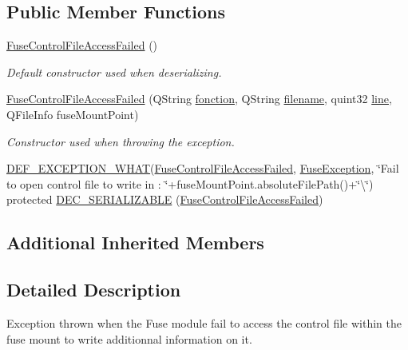 \subsection*{Public Member Functions}
\begin{DoxyCompactItemize}
\item 
\hyperlink{class_gost_crypt_1_1_fuse_driver_1_1_fuse_control_file_access_failed_aad1e46a257f485e7716c7c75765245b1}{Fuse\+Control\+File\+Access\+Failed} ()
\begin{DoxyCompactList}\small\item\em Default constructor used when deserializing. \end{DoxyCompactList}\item 
\hyperlink{class_gost_crypt_1_1_fuse_driver_1_1_fuse_control_file_access_failed_ae848ed52b1604cc801a9811f53493635}{Fuse\+Control\+File\+Access\+Failed} (Q\+String \hyperlink{class_gost_crypt_1_1_gost_crypt_exception_a29b8c93d5efbb1ff369107385725a939}{fonction}, Q\+String \hyperlink{class_gost_crypt_1_1_gost_crypt_exception_a749a12375f4ba9d502623b99d8252f38}{filename}, quint32 \hyperlink{class_gost_crypt_1_1_gost_crypt_exception_abf506d911f12a4e969eea500f90bd32c}{line}, Q\+File\+Info fuse\+Mount\+Point)
\begin{DoxyCompactList}\small\item\em Constructor used when throwing the exception. \end{DoxyCompactList}\item 
\hyperlink{_gost_crypt_exception_8h_a5bc1e1c6c9d6f46c84eeba49e33355f9}{D\+E\+F\+\_\+\+E\+X\+C\+E\+P\+T\+I\+O\+N\+\_\+\+W\+H\+AT}(\hyperlink{class_gost_crypt_1_1_fuse_driver_1_1_fuse_control_file_access_failed}{Fuse\+Control\+File\+Access\+Failed}, \hyperlink{class_gost_crypt_1_1_fuse_driver_1_1_fuse_exception}{Fuse\+Exception}, \char`\"{}Fail to open control file to write in \+: \char`\"{}+fuse\+Mount\+Point.\+absolute\+File\+Path()+\char`\"{}\textbackslash{}\char`\"{}) protected \hyperlink{class_gost_crypt_1_1_fuse_driver_1_1_fuse_control_file_access_failed_a931a0419c2569d1f86278bfb031408d1}{D\+E\+C\+\_\+\+S\+E\+R\+I\+A\+L\+I\+Z\+A\+B\+LE} (\hyperlink{class_gost_crypt_1_1_fuse_driver_1_1_fuse_control_file_access_failed}{Fuse\+Control\+File\+Access\+Failed})
\end{DoxyCompactItemize}
\subsection*{Additional Inherited Members}


\subsection{Detailed Description}
Exception thrown when the Fuse module fail to access the control file within the fuse mount to write additionnal information on it. 


